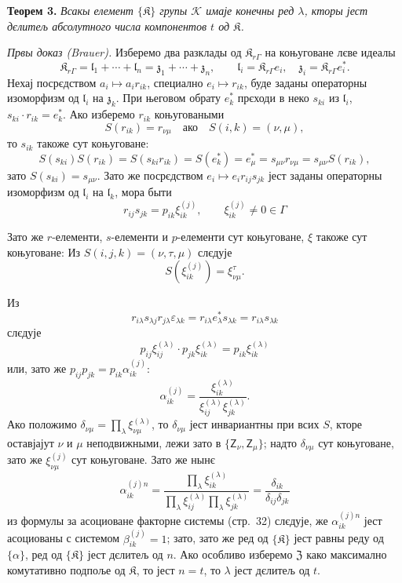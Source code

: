\documentclass[11pt]{article}
\begin{document}
\textbf{Теорем 3.} \emph{Всакы елемент \(\{\mathfrak K\}\) групы \(\mathscr K\) имаје конечны ред \(\lambda\), кторы јест дєлитељ абсолутного числа компонентов \(t\) од \(\mathfrak K\).}

\emph{Првы доказ (Brauer).} Изберемо два разклады од \(\mathfrak K_{r\Gamma}\) на коњуговане лєве идеалы
\[
\mathfrak K_{r\Gamma}=\mathfrak l_1+\cdots+\mathfrak l_n=\mathfrak z_1+\cdots+\mathfrak z_n,\qquad
\mathfrak l_i=\mathfrak K_{r\Gamma}e_i,\quad
\mathfrak z_i=\mathfrak K_{r\Gamma}e_i^*.
\]
Нехај посрєдством \(a_i\mapsto a_ir_{ik}\), специално \(e_i\mapsto r_{ik}\), буде заданы операторны изоморфизм од \(\mathfrak l_i\) на \(\mathfrak z_k\). При његовом обрату \(e_k^*\) прєходи в неко \(s_{ki}\) из \(\mathfrak l_i\), \(s_{ki}\cdot r_{ik}=e_k^*\). Ако изберемо \(r_{ik}\) коњуговаными
\[
S(r_{ik})=r_{\nu\mu}\quad\text{ако}\quad S(i,k)=(\nu,\mu),
\]
то \(s_{ik}\) такоже сут коњуговане:
\[
S(s_{ki})S(r_{ik})=S(s_{ki}r_{ik})=S(e_k^*)=e_\mu^*
=s_{\mu\nu}r_{\nu\mu}=s_{\mu\nu}S(r_{ik}),
\]
зато \(S(s_{ki})=s_{\mu\nu}\). Зато же посрєдством \(e_i\mapsto e_ir_{ij}s_{jk}\) јест заданы операторны изоморфизм од \(\mathfrak l_i\) на \(\mathfrak l_k\), мора быти
\[
r_{ij}s_{jk}=p_{ik}\xi_{ik}^{(j)},\qquad
\xi_{ik}^{(j)}\ne0\in\Gamma
\]

Зато же \(r\)-елементи, \(s\)-елементи и \(p\)-елементи сут коњуговане, \(\xi\) такоже сут коњуговане: Из \(S(i,j,k)=(\nu,\tau,\mu)\) слєдује
\[
S(\xi_{ik}^{(j)})=\xi_{\nu\mu}^{\tau}.
\]

Из
\[
r_{i\lambda}s_{\lambda j}r_{j\lambda}\varepsilon_{\lambda k}
=r_{i\lambda}e_\lambda^*s_{\lambda k}
=r_{i\lambda}s_{\lambda k}
\]
слєдује
\[
p_{ij}\xi_{ij}^{(\lambda)}\cdot p_{jk}\xi_{ik}^{(\lambda)}
=p_{ik}\xi_{ik}^{(\lambda)}
\]
или, зато же \(p_{ij}p_{jk}=p_{ik}\alpha_{ik}^{(j)}\):
\[
\alpha_{ik}^{(j)}
=\frac{\xi_{ik}^{(\lambda)}}{\xi_{ij}^{(\lambda)}\xi_{jk}^{(\lambda)}}.
\]
Ако положимо \(\delta_{\nu\mu}=\prod_{\lambda}\xi_{\nu\mu}^{(\lambda)}\), то \(\delta_{\nu\mu}\) јест инвариантны при всих \(S\), кторе оставјајут \(\nu\) и \(\mu\) неподвижными, лежи зато в \(\{\mathsf{Z}_\nu,\mathsf{Z}_\mu\}\); надто \(\delta_{\nu\mu}\) сут коњуговане, зато же \(\xi_{\nu\mu}^{(j)}\) сут коњуговане. Зато же нынє
\[
\alpha_{ik}^{(j)n}
=\frac{\prod_{\lambda}\xi_{ik}^{(\lambda)}}
       {\prod_{\lambda}\xi_{ij}^{(\lambda)}\prod_{\lambda}\xi_{jk}^{(\lambda)}}
=\frac{\delta_{ik}}{\delta_{ij}\delta_{jk}}
\]
из формулы за асоциоване факторне системы (стр.~32) слєдује, же \(\alpha_{ik}^{(j)n}\) јест асоциованы с системом \(\beta_{ik}^{(j)}=1\); зато, зато же ред од \(\{\mathfrak K\}\) јест равны реду од \(\{\alpha\}\), ред од \(\{\mathfrak K\}\) јест дєлитељ од \(n\). Ако особливо изберемо \(\mathfrak Z\) како максимално комутативно подпоље од \(\mathfrak K\), то јест \(n=t\), то \(\lambda\) јест дєлитељ од \(t\).
\end{document}
